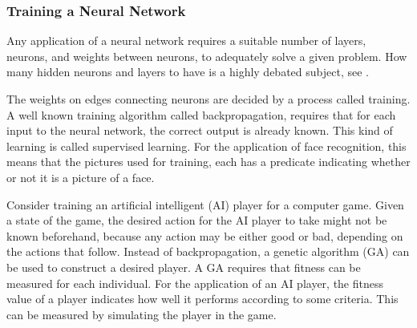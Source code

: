 \subsubsection{Training a Neural Network}
Any applica\-tion of a neural network requires a suitable number of layers, neurons, and weights between neurons, to adequately solve a given problem. How many hidden neurons and layers to have is a highly debated subject, see \cite{sarle1997}.

The weights on edges connecting neurons are decided by a process called training.  A well known training algorithm called backpropagation, requires that for each input to the neural network, the correct output is already known\cite{backpropagation}. This kind of learning is called supervised learning. For the application of face recognition, this means that the pictures used for training, each has a predicate indicating whether or not it is a picture of a face.

Consider training an artificial intelligent (AI) player for a computer game. Given a state of the game, the desired action for the AI player to take might not be known beforehand, because any action may be either good or bad, depending on the actions that follow.  Instead of backpropagation, a genetic algorithm (GA) can be used to construct a desired player. A GA requires that fitness can be measured for each individual. For the application of an AI player, the fitness value of a player indicates how well it performs according to some criteria. This can be measured by simulating the player in the game.
